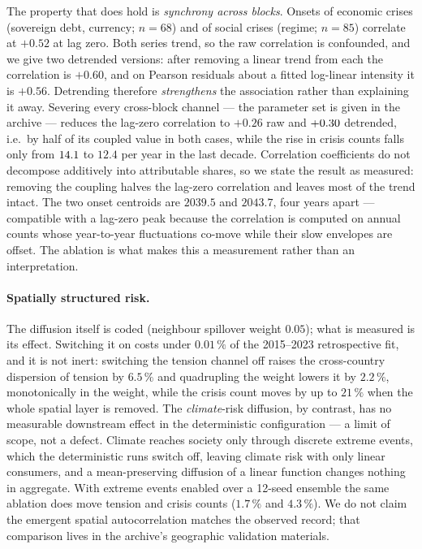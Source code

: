 \documentclass[12pt,a4paper]{article}
\newcommand{\syncRaw}{0.52} \newcommand{\syncAbl}{0.26}
\begin{document}
The property that does hold is \emph{synchrony across blocks}. Onsets of economic crises
(sovereign debt, currency; $n=68$) and of social crises (regime; $n=85$) correlate at
$+\syncRaw$ at lag zero. Both series trend, so the raw correlation is confounded, and we give
two detrended versions: after removing a linear trend from each the correlation is $+0.60$,
and on Pearson residuals about a fitted log-linear intensity it is $+0.56$. Detrending
therefore \emph{strengthens} the association rather than explaining it away. Severing every
cross-block channel --- the parameter set is given in the archive --- reduces the lag-zero
correlation to $+\syncAbl$ raw and $+0.30$ detrended, i.e.\ by half of its coupled
value in both cases, while the rise in crisis counts falls only from $14.1$ to $12.4$
per year in the last decade. Correlation coefficients do not decompose additively into
attributable shares, so we state the result as measured: removing the coupling halves the
lag-zero correlation and leaves most of the trend intact. The two onset centroids are $2039.5$
and $2043.7$, four years apart --- compatible with a lag-zero peak because the correlation is
computed on annual counts whose year-to-year fluctuations co-move while their slow envelopes
are offset. The ablation is what makes this a measurement rather than an interpretation.

\paragraph{Spatially structured risk.} The diffusion itself is coded (neighbour spillover
weight $0.05$); what is measured is its effect. Switching it on costs under $0.01\,\%$ of the
2015--2023 retrospective fit, and it is not inert: switching the tension channel off raises
the cross-country dispersion of tension by $6.5\,\%$ and quadrupling the weight lowers it by
$2.2\,\%$, monotonically in the weight, while the crisis count moves by up to $21\,\%$ when the
whole spatial layer is removed. The \emph{climate}-risk diffusion, by contrast, has no
measurable downstream effect in the deterministic configuration --- a limit of scope, not a
defect. Climate reaches society only through discrete extreme events, which the deterministic
runs switch off, leaving climate risk with only linear consumers, and a mean-preserving
diffusion of a linear function changes nothing in aggregate. With extreme events enabled over a
12-seed ensemble the same ablation does move tension and crisis counts ($1.7\,\%$ and
$4.3\,\%$). We do not claim the emergent spatial autocorrelation matches the observed record;
that comparison lives in the archive's geographic validation materials.
\end{document}
